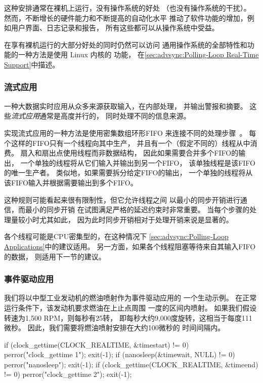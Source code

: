 这种安排通常在裸机上运行，没有操作系统的好处
（也没有操作系统的干扰）。
然而，不断增长的硬件能力和不断提高的自动化水平
推动了软件功能的增加，例如用户界面、日志记录和报告，
所有这些都可以从操作系统中受益。

在享有裸机运行的大部分好处的同时仍然可以访问
通用操作系统的全部特性和功能的一种方法是使用
Linux 内核的  功能，
在\cref{sec:advsync:Polling-Loop Real-Time Support}中描述。

\subsubsection{流式应用}
\label{sec:advsync:Streaming Applications}

一种大数据实时应用从众多来源获取输入，在内部处理，
并输出警报和摘要。
这些\emph{流式应用}通常是高度并行的，
同时处理不同的信息来源。

实现流式应用的一种方法是使用密集数组环形FIFO
来连接不同的处理步骤~\cite{AdrianSutton2013LCA:Disruptor}。
每个这样的FIFO只有一个线程向其中生产，
并且有一个（假定不同的）线程从中消费。
扇入和扇出点使用线程而非数据结构，
因此如果需要合并多个FIFO的输出，
一个单独的线程将从它们输入并输出到另一个FIFO，
该单独线程是该FIFO的唯一生产者。
类似地，如果需要拆分给定FIFO的输出，
一个单独的线程将从该FIFO输入并根据需要输出到多个FIFO。

这种规则可能看起来很有限制性，但它允许线程之间
以最小的同步开销进行通信，而最小的同步开销
在试图满足严格的延迟约束时非常重要。
当每个步骤的处理量较小时尤其如此，
因为此时同步开销相对于处理开销来说是显著的。

各个线程可能是CPU密集型的，在这种情况下
\cref{sec:advsync:Polling-Loop Applications}中的建议适用。
另一方面，如果各个线程阻塞等待来自其输入FIFO的数据，
则适用下一节的建议。

\subsubsection{事件驱动应用}
\label{sec:advsync:Event-Driven Applications}

我们将以中型工业发动机的燃油喷射作为事件驱动应用的
一个生动示例。
在正常运行条件下，该发动机要求燃油在上止点周围
一度的区间内喷射。
如果我们假设转速为1,500 RPM，则每秒有25转，
即每秒大约9,000度旋转，这相当于每度111微秒。
因此，我们需要将燃油喷射安排在大约100微秒的
时间间隔内。

\begin{listing}
\begin{fcvlabel}
\begin{VerbatimL}
if (clock_gettime(CLOCK_REALTIME, &timestart) != 0) {
	perror("clock_gettime 1");
	exit(-1);
}
if (nanosleep(&timewait, NULL) != 0) {
	perror("nanosleep");
	exit(-1);
}
if (clock_gettime(CLOCK_REALTIME, &timeend) != 0) {
	perror("clock_gettime 2");
	exit(-1);
}
\end{VerbatimL}
\end{fcvlabel}
\caption{定时等待测试程序}
\label{lst:advsync:Timed-Wait Test Program}
\end{listing}

